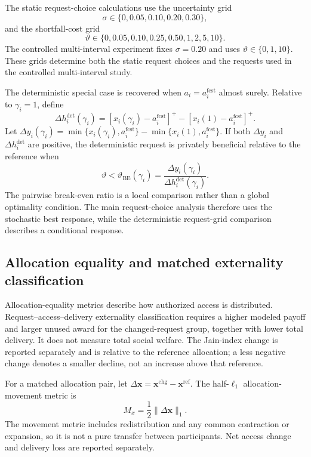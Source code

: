 \documentclass[11pt]{article}
\begin{document}
The static request-choice calculations use the uncertainty grid
\[
\sigma\in\{0,0.05,0.10,0.20,0.30\},
\]
and the shortfall-cost grid
\[
\vartheta\in\{0,0.05,0.10,0.25,0.50,1,2,5,10\}.
\]
The controlled multi-interval experiment fixes $\sigma=0.20$ and uses
$\vartheta\in\{0,1,10\}$. These grids determine both the static request choices
and the requests used in the controlled multi-interval study.

The deterministic special case is recovered when
$a_i=a_i^{\mathrm{fcst}}$ almost surely. Relative to $\gamma_i=1$, define
\begin{equation}
\Delta h_i^{\mathrm{det}}(\gamma_i)
= [x_i(\gamma_i)-a_i^{\mathrm{fcst}}]^+
- [x_i(1)-a_i^{\mathrm{fcst}}]^+.
\label{eq:supp_incremental_idle_award}
\end{equation}
Let $\Delta y_i(\gamma_i)=
\min\{x_i(\gamma_i),a_i^{\mathrm{fcst}}\}-\min\{x_i(1),a_i^{\mathrm{fcst}}\}$.
If both $\Delta y_i$ and
$\Delta h_i^{\mathrm{det}}$ are positive, the deterministic request is privately
beneficial relative to the reference when
\begin{equation}
\vartheta<\vartheta_{\mathrm{BE}}(\gamma_i)
=\frac{\Delta y_i(\gamma_i)}{\Delta h_i^{\mathrm{det}}(\gamma_i)}.
\label{eq:supp_break_even_penalty}
\end{equation}
The pairwise break-even ratio is a local comparison rather than a global
optimality condition. The main request-choice analysis therefore uses the stochastic
best response, while the deterministic request-grid comparison describes a
conditional response.

\subsection{Allocation equality and matched externality classification}

Allocation-equality metrics describe how authorized access is distributed.
Request--access--delivery externality classification requires a higher modeled
payoff and larger unused award for the changed-request group, together with
lower total delivery. It does not measure total social welfare. The Jain-index
change is reported separately and is relative to the reference allocation;
a less negative change denotes a smaller decline, not an increase above that
reference.

For a matched allocation pair, let
$\Delta\mathbf x=\mathbf x^{\mathrm{chg}}-\mathbf x^{\mathrm{ref}}$. The
half-$\ell_1$ allocation-movement metric is
\begin{equation}
M_x=\frac12\lVert\Delta\mathbf x\rVert_1.
\label{eq:supp_allocation_movement}
\end{equation}
The movement metric includes redistribution and any common contraction or
expansion, so it is not a pure transfer between participants. Net access change
and delivery loss are reported separately.
\end{document}

